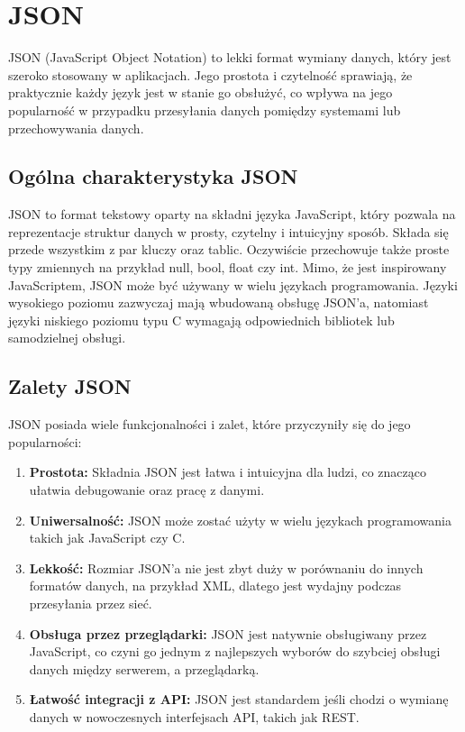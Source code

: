 \section{JSON}
\label{section:JSON}
JSON \cite{JSON} (JavaScript Object Notation) to lekki format wymiany danych, który jest szeroko stosowany w aplikacjach. Jego prostota i czytelność sprawiają, że praktycznie każdy język jest w stanie go obsłużyć, co wpływa na jego popularność w przypadku przesyłania danych pomiędzy systemami lub przechowywania danych.
\subsection{Ogólna charakterystyka JSON}
JSON to format tekstowy oparty na składni języka JavaScript, który pozwala na reprezentacje struktur danych w prosty, czytelny i intuicyjny sposób. Składa się przede wszystkim z par kluczy oraz tablic. Oczywiście przechowuje także proste typy zmiennych na przykład null, bool, float czy int. Mimo, że jest inspirowany JavaScriptem, JSON może być używany w wielu językach programowania. Języki wysokiego poziomu zazwyczaj mają wbudowaną obsługę JSON'a, natomiast języki niskiego poziomu typu C wymagają odpowiednich bibliotek lub samodzielnej obsługi.

\subsection{Zalety JSON}
JSON posiada wiele funkcjonalności i zalet, które przyczyniły się do jego popularności:
\begin{enumerate}
    \item \textbf{Prostota:}  
    Składnia JSON jest łatwa i intuicyjna dla ludzi, co znacząco ułatwia debugowanie oraz pracę z danymi.
    \item \textbf{Uniwersalność:}  
    JSON może zostać użyty w wielu językach programowania takich jak JavaScript czy C.
    \item \textbf{Lekkość:}  
    Rozmiar JSON'a nie jest zbyt duży w porównaniu do innych formatów danych, na przykład XML, dlatego jest wydajny podczas przesyłania przez sieć.
    \item \textbf{Obsługa przez przeglądarki:}  
    JSON jest natywnie obsługiwany przez JavaScript, co czyni go jednym z najlepszych wyborów do szybciej obsługi danych między serwerem, a przeglądarką.
    \item \textbf{Łatwość integracji z API:}  
    JSON jest standardem jeśli chodzi o wymianę danych w nowoczesnych interfejsach API, takich jak REST.
\end{enumerate}
